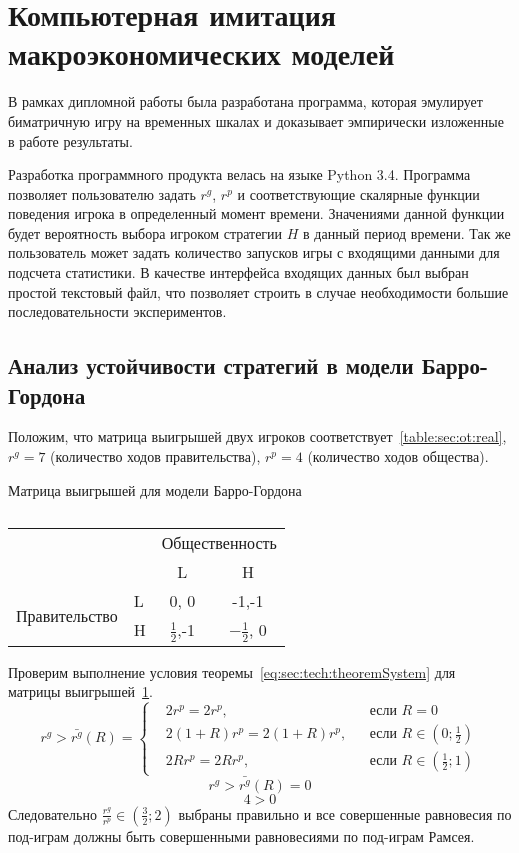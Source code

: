 \section{Компьютерная имитация макроэкономических моделей} 

В рамках дипломной работы была разработана программа, которая эмулирует
биматричную игру на временных шкалах и доказывает эмпирически изложенные в
работе результаты.  

Разработка программного продукта велась на языке Python 3.4.
Программа позволяет пользователю задать $r^g$, $r^p$ и соответствующие
скалярные функции поведения игрока в определенный момент времени. Значениями
данной функции будет вероятность выбора игроком  стратегии $H$ в данный период
времени. Так же пользователь может задать количество запусков игры с входящими
данными для подсчета статистики. В качестве интерфейса входящих данных был
выбран простой текстовый файл, что позволяет строить в случае необходимости 
большие последовательности экспериментов.

\subsection{Анализ устойчивости стратегий в модели Барро-Гордона}
Положим, что матрица выигрышей двух игроков соответствует~\ref{table:sec:ot:real},
$r^g= 7$ (количество ходов правительства), $r^p= 4$ (количество ходов общества).

\begin{table}[h]
	\centering
	
	\caption{}	
			 Матрица выигрышей для модели Барро-Гордона\\
			\normalsize
			
\begin{tabular}{|l|l|c|c|}
	\hline
	\multicolumn{2}{|l|}{\multirow{2}{*}{}} & \multicolumn{2}{l|}{Общественность} \\ \cline{3-4} 
	\multicolumn{2}{|l|}{}                  & L                & H                \\ \hline
	\multirow{2}{*}{Правительство}    & L   & 0, 0             & -1,-1            \\ \cline{2-4} 
	& H   & $\frac{1}{2}$,-1             & $-\frac{1}{2}$, 0            \\ \hline
\end{tabular}

	\label{table:sec:ot:real1}
\end{table}

Проверим выполнение условия теоремы~\ref{eq:sec:tech:theoremSystem} для матрицы выигрышей~\ref{table:sec:ot:real1}. 
$$
r^g> \bar{r^g}(R) = \left\{ 
\begin{aligned} 
&2r^p= 2r^p, &&\text{если } R=0
\\
&2(1+R)r^p= 2(1+R)r^p, &&\text{если } 	R\in\left(0; \frac{1}{2}\right)
\\
&2Rr^p= 2Rr^p, &&\text{если } 	R\in\left( \frac{1}{2};1\right)
\end{aligned}
\right.		
$$
$$
r^g> \bar{r^g}(R) = 0$$
$$
4 > 0
$$
Следовательно $\frac{r^g}{r^p} \in \left(\frac{3}{2};2\right)$ выбраны
правильно и все совершенные равновесия по под-играм должны быть совершенными
равновесиями по под-играм Рамсея. 
 
